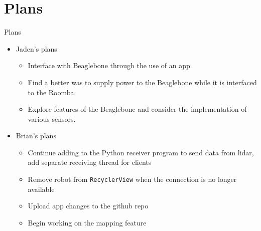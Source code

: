 \documentclass{beamer}
\begin{document}
\section{Plans}
\begin{frame}{Plans}{}
    \begin{itemize}
        \item Jaden's plans
        \begin{itemize}
            \item Interface with Beaglebone through the use of an app.
           \item Find a better was to supply power to the Beaglebone while it is interfaced to the Roomba.
            \item Explore features of the Beaglebone and consider the implementation of various sensors.
        \end{itemize}
    \end{itemize}
    
    \begin{itemize}
        \item Brian's plans    
        \begin{itemize}
            \item Continue adding to the Python receiver program to send data from lidar, add separate receiving thread for clients
            \item Remove robot from \texttt{RecyclerView} when the connection is no longer available
            \item Upload app changes to the github repo
            \item Begin working on the mapping feature
        \end{itemize}
    \end{itemize}
\end{frame}

\end{document}
